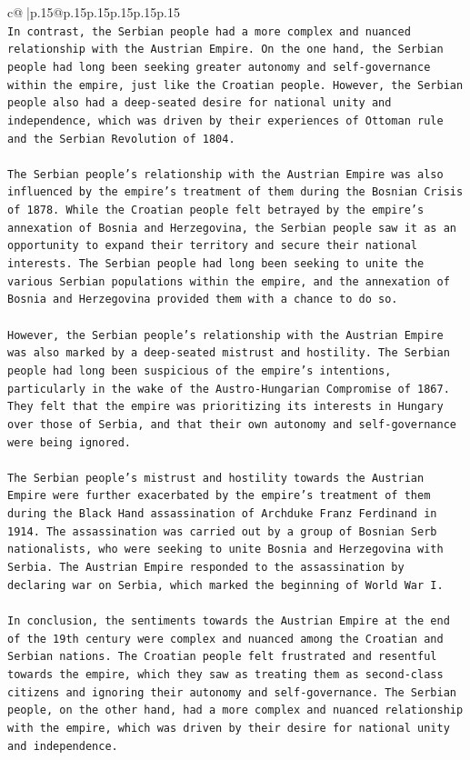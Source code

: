 \documentclass{article}
\begin{document}
{\begin{supertabular}{c@{$\;$}|p{.15\linewidth}@{}p{.15\linewidth}p{.15\linewidth}p{.15\linewidth}p{.15\linewidth}p{.15\linewidth}}
{{{\\ 
\texttt{In contrast, the Serbian people had a more complex and nuanced relationship with the Austrian Empire. On the one hand, the Serbian people had long been seeking greater autonomy and self{-}governance within the empire, just like the Croatian people. However, the Serbian people also had a deep{-}seated desire for national unity and independence, which was driven by their experiences of Ottoman rule and the Serbian Revolution of 1804.} \\
\\ 
\texttt{The Serbian people's relationship with the Austrian Empire was also influenced by the empire's treatment of them during the Bosnian Crisis of 1878. While the Croatian people felt betrayed by the empire's annexation of Bosnia and Herzegovina, the Serbian people saw it as an opportunity to expand their territory and secure their national interests. The Serbian people had long been seeking to unite the various Serbian populations within the empire, and the annexation of Bosnia and Herzegovina provided them with a chance to do so.} \\
\\ 
\texttt{However, the Serbian people's relationship with the Austrian Empire was also marked by a deep{-}seated mistrust and hostility. The Serbian people had long been suspicious of the empire's intentions, particularly in the wake of the Austro{-}Hungarian Compromise of 1867. They felt that the empire was prioritizing its interests in Hungary over those of Serbia, and that their own autonomy and self{-}governance were being ignored.} \\
\\ 
\texttt{The Serbian people's mistrust and hostility towards the Austrian Empire were further exacerbated by the empire's treatment of them during the Black Hand assassination of Archduke Franz Ferdinand in 1914. The assassination was carried out by a group of Bosnian Serb nationalists, who were seeking to unite Bosnia and Herzegovina with Serbia. The Austrian Empire responded to the assassination by declaring war on Serbia, which marked the beginning of World War I.} \\
\\ 
\texttt{In conclusion, the sentiments towards the Austrian Empire at the end of the 19th century were complex and nuanced among the Croatian and Serbian nations. The Croatian people felt frustrated and resentful towards the empire, which they saw as treating them as second{-}class citizens and ignoring their autonomy and self{-}governance. The Serbian people, on the other hand, had a more complex and nuanced relationship with the empire, which was driven by their desire for national unity and independence.} \\
}}}
\end{supertabular}}
\end{document}
